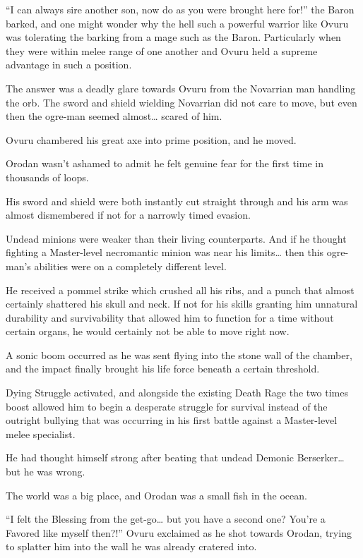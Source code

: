 \documentclass[a4paper,10pt]{book}
\begin{document}
“I can always sire another son, now do as you were brought here for!” the Baron barked, and one might wonder why the hell such a powerful warrior like Ovuru was tolerating the barking from a mage such as the Baron. Particularly when they were within melee range of one another and Ovuru held a supreme advantage in such a position.\par
The answer was a deadly glare towards Ovuru from the Novarrian man handling the orb. The sword and shield wielding Novarrian did not care to move, but even then the ogre-man seemed almost… scared of him.\par
Ovuru chambered his great axe into prime position, and he moved.\par
Orodan wasn’t ashamed to admit he felt genuine fear for the first time in thousands of loops.\par
His sword and shield were both instantly cut straight through and his arm was almost dismembered if not for a narrowly timed evasion.\par
Undead minions were weaker than their living counterparts. And if he thought fighting a Master-level necromantic minion was near his limits… then this ogre-man’s abilities were on a completely different level.\par
He received a pommel strike which crushed all his ribs, and a punch that almost certainly shattered his skull and neck. If not for his skills granting him unnatural durability and survivability that allowed him to function for a time without certain organs, he would certainly not be able to move right now.\par
A sonic boom occurred as he was sent flying into the stone wall of the chamber, and the impact finally brought his life force beneath a certain threshold.\par
Dying Struggle activated, and alongside the existing Death Rage the two times boost allowed him to begin a desperate struggle for survival instead of the outright bullying that was occurring in his first battle against a Master-level melee specialist.\par
He had thought himself strong after beating that undead Demonic Berserker… but he was wrong.\par
The world was a big place, and Orodan was a small fish in the ocean.\par
“I felt the Blessing from the get-go… but you have a second one? You’re a Favored like myself then?!” Ovuru exclaimed as he shot towards Orodan, trying to splatter him into the wall he was already cratered into.\par
\end{document}
